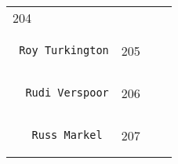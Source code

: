 \documentclass[]{article}
\begin{document}
\begin{longtable}[c]{@{}llll@{}}
\begin{minipage}[t]{0.10\columnwidth}
204
\end{minipage} & \begin{minipage}[t]{0.13\columnwidth}\raggedright
\end{minipage} & \begin{minipage}[t]{0.15\columnwidth}\raggedright
\end{minipage}
\\\noalign{\medskip}
\begin{minipage}[t]{0.39\columnwidth}\raggedright
\begin{verbatim}
 Roy Turkington
\end{verbatim}
\end{minipage} & \begin{minipage}[t]{0.10\columnwidth}\raggedright
205
\end{minipage} & \begin{minipage}[t]{0.13\columnwidth}\raggedright
\end{minipage} & \begin{minipage}[t]{0.15\columnwidth}\raggedright
\end{minipage}
\\\noalign{\medskip}
\begin{minipage}[t]{0.39\columnwidth}\raggedright
\begin{verbatim}
  Rudi Verspoor
\end{verbatim}
\end{minipage} & \begin{minipage}[t]{0.10\columnwidth}\raggedright
206
\end{minipage} & \begin{minipage}[t]{0.13\columnwidth}\raggedright
\end{minipage} & \begin{minipage}[t]{0.15\columnwidth}\raggedright
\end{minipage}
\\\noalign{\medskip}
\begin{minipage}[t]{0.39\columnwidth}\raggedright
\begin{verbatim}
   Russ Markel
\end{verbatim}
\end{minipage} & \begin{minipage}[t]{0.10\columnwidth}\raggedright
207
\end{minipage} & \begin{minipage}[t]{0.13\columnwidth}\raggedright
\end{minipage} & \begin{minipage}[t]{0.15\columnwidth}\raggedright

\end{minipage}
\end{longtable}
\end{document}
